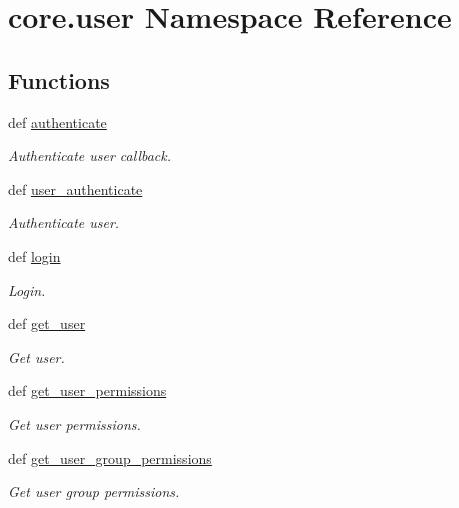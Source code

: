 \hypertarget{namespacecore_1_1user}{\section{core.\-user Namespace Reference}
\label{namespacecore_1_1user}
}
\subsection*{Functions}
\begin{DoxyCompactItemize}
\item 
def \hyperlink{namespacecore_1_1user_a3983ed09cece4fb560d558a08f6e6089}{authenticate}
\begin{DoxyCompactList}\small\item\em Authenticate user callback. \end{DoxyCompactList}\item 
def \hyperlink{namespacecore_1_1user_ad55fc9eb4c249413d6be9d12fddfa4d4}{user\-\_\-authenticate}
\begin{DoxyCompactList}\small\item\em Authenticate user. \end{DoxyCompactList}\item 
def \hyperlink{namespacecore_1_1user_a372c8bdc473a9a90cf94d5e396969a67}{login}
\begin{DoxyCompactList}\small\item\em Login. \end{DoxyCompactList}\item 
def \hyperlink{namespacecore_1_1user_a5826091672baf900eb6bc4275cac34cf}{get\-\_\-user}
\begin{DoxyCompactList}\small\item\em Get user. \end{DoxyCompactList}\item 
def \hyperlink{namespacecore_1_1user_afa496c646ca62b37b054428a1effc2a4}{get\-\_\-user\-\_\-permissions}
\begin{DoxyCompactList}\small\item\em Get user permissions. \end{DoxyCompactList}\item 
def \hyperlink{namespacecore_1_1user_a31850a70ad1c21ecd896c4e01d3853b6}{get\-\_\-user\-\_\-group\-\_\-permissions}
\begin{DoxyCompactList}\small\item\em Get user group permissions. \end{DoxyCompactList}\item 

\end{DoxyCompactItemize}
